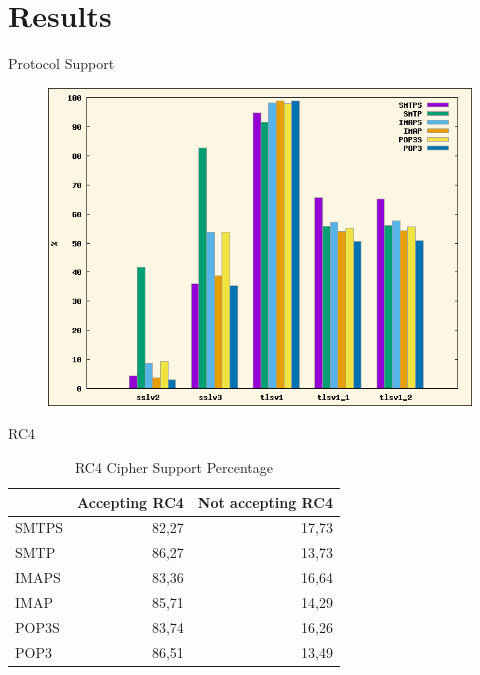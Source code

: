 \section{Results}\label{results}

\begin{frame}{Protocol Support}

\begin{figure}[h!]
  \centering
  \includegraphics[scale=0.55]{protocol_support}
\end{figure}

\end{frame}

\begin{frame}{RC4}

\begin{table}[h]
\centering
\begin{tabular}{|l|rr|}
\hline
& Accepting RC4 & Not accepting RC4 \\
\hline
SMTPS & 82,27                & 17,73     \\
SMTP  & 86,27                & 13,73     \\
IMAPS & 83,36                & 16,64     \\
IMAP  & 85,71                & 14,29     \\
POP3S & 83,74                & 16,26     \\
POP3  & 86,51                & 13,49     \\
\hline
\end{tabular}
\caption{RC4 Cipher Support Percentage}
\label{tab:rc4-support-percentage}
\end{table}

\end{frame}

